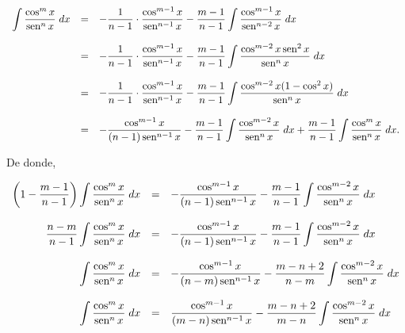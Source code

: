 \begin{enumerate}[\bfseries 1.]
	$$
	\begin{array}{rcl}
	    \displaystyle\int \dfrac{\cos^m x}{\sen^n x}\; dx &=& -\dfrac{1}{n-1}\cdot \dfrac{\cos^{m-1}x}{\sen^{n-1}x}-\dfrac{m-1}{n-1}\displaystyle\int\dfrac{\cos^{m-1}x}{\sen^{n-2}x}\; dx\\\\
							      &=& -\dfrac{1}{n-1}\cdot \dfrac{\cos^{m-1}x}{\sen^{n-1}x}-\dfrac{m-1}{n-1}\displaystyle\int \dfrac{\cos^{m-2}x\sen^2 x}{\sen^n x}\; dx\\\\
							      &=& -\dfrac{1}{n-1}\cdot \dfrac{\cos^{m-1}x}{\sen^{n-1}x}-\dfrac{m-1}{n-1}\displaystyle\int \dfrac{\cos^{m-2}x(1-\cos^2 x)}{\sen^n x}\; dx\\\\
							      &=& -\dfrac{\cos^{m-1}x}{(n-1)\sen^{n-1}x}-\dfrac{m-1}{n-1}\displaystyle\int \dfrac{\cos^{m-2}x}{\sen^{n}x}\; dx + \dfrac{m-1}{n-1}\int \dfrac{\cos^m x}{\sen^n x}\; dx.
	\end{array}
	$$

	De donde, 

	$$
	\begin{array}{rcl}
	    \left(1-\dfrac{m-1}{n-1}\right)\displaystyle\int\dfrac{\cos^m x}{\sen^n x}\; dx &=& -\dfrac{\cos^{m-1}x}{(n-1)\sen^{n-1}x}-\dfrac{m-1}{n-1}\displaystyle\int\dfrac{\cos^{m-2}x}{\sen^n x}\; dx\\\\
	    \dfrac{n-m}{n-1} \displaystyle\int \dfrac{\cos^m x}{\sen^n x}\; dx &=& -\dfrac{\cos^{m-1}x}{(n-1)\sen^{n-1}x}-\dfrac{m-1}{n-1}\displaystyle\int \dfrac{\cos^{m-2}x}{\sen^n x}\; dx\\\\
	    \displaystyle\int \dfrac{\cos^m x}{\sen^n x}\; dx &=& -\dfrac{\cos^{m-1}x}{(n-m)\sen^{n-1}x}-\dfrac{m-n+2}{n-m}\displaystyle\int \dfrac{\cos^{m-2}x}{\sen^n x}\; dx\\\\
	    \displaystyle\int \dfrac{\cos^m x}{\sen^n x}\; dx &=& \dfrac{\cos^{m-1}x}{(m-n)\sen^{n-1}x}-\dfrac{m-n+2}{m-n}\displaystyle\int \dfrac{\cos^{m-2}x}{\sen^n x}\; dx\\\\
	\end{array}
	$$
	\vspace{0.5cm}



\end{enumerate}
